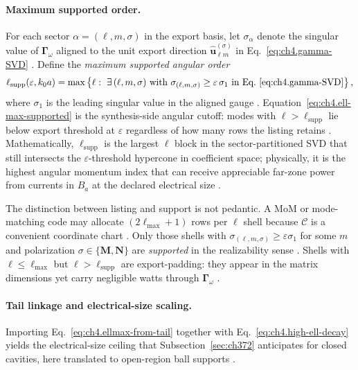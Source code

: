 \paragraph{Maximum supported order.}
For each sector \(\alpha=(\ell,m,\sigma)\) in the export basis, let \(\sigma_{\alpha}\) denote the singular value of
\(\boldsymbol{\Gamma}_\omega\) aligned to the unit export direction \(\widehat{\mathbf{u}}_{\ell m}^{(\sigma)}\) in
Eq.~\eqref{eq:ch4.gamma-SVD} \cite{harrington2001,hansen1988}. Define the \emph{maximum supported angular order}
\begin{equation}
\label{eq:ch4.ell-max-supported}
\ell_{\mathrm{supp}}(\varepsilon,k_{0}a)
=
\max\left\{
\ell:\ \exists\,(\ell,m,\sigma)\ \text{with}\ 
\sigma_{(\ell,m,\sigma)}\ge\varepsilon\,\sigma_{1}
\ \text{in Eq.~\eqref{eq:ch4.gamma-SVD}}
\right\},
\end{equation}
where \(\sigma_{1}\) is the leading singular value in the aligned gauge \cite{hansen1988,stratton1941}. Equation~\eqref{eq:ch4.ell-max-supported}
is the synthesis-side angular cutoff: modes with \(\ell>\ell_{\mathrm{supp}}\) lie below export threshold at \(\varepsilon\) regardless
of how many rows the listing retains \cite{devaney2004,harrington2001}. Mathematically, \(\ell_{\mathrm{supp}}\) is the largest
\(\ell\) block in the sector-partitioned SVD that still intersects the \(\varepsilon\)-threshold hypercone in coefficient space;
physically, it is the highest angular momentum index that can receive appreciable far-zone power from currents in \(B_{a}\) at the
declared electrical size \cite{jackson1999,hansen1988}.

The distinction between listing and support is not pedantic. A MoM or mode-matching code may allocate \((2\ell_{\max}+1)\) rows per
\(\ell\) shell because \(\mathcal{C}\) is a convenient coordinate chart \cite{stratton1941}. Only those shells with
\(\sigma_{(\ell,m,\sigma)}\ge\varepsilon\sigma_{1}\) for some \(m\) and polarization \(\sigma\in\{\mathbf{M},\mathbf{N}\}\) are
\emph{supported} in the realizability sense \cite{hansen1988}. Shells with \(\ell\le\ell_{\max}\) but \(\ell>\ell_{\mathrm{supp}}\)
are export-padding: they appear in the matrix dimensions yet carry negligible watts through \(\boldsymbol{\Gamma}_\omega\)
\cite{devaney2004,harrington2001}.

\paragraph{Tail linkage and electrical-size scaling.}
Importing Eq.~\eqref{eq:ch4.ellmax-from-tail} together with Eq.~\eqref{eq:ch4.high-ell-decay} yields the electrical-size ceiling
that Subsection~\ref{sec:ch372} anticipates for closed cavities, here translated to open-region ball supports
\cite{hansen1988,jackson1999,stratton1941}.


